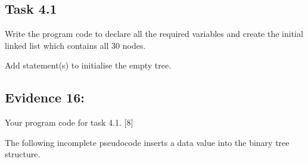 \subsection*{Task 4.1 }

Write the program code to declare all the required variables and create
the initial linked list which contains all 30 nodes. 

Add statement(s) to initialise the empty tree. 

\subsection*{Evidence 16: }

Your program code for task 4.1. \hfill{}{[}8{]}

The following incomplete pseudocode inserts a data value into the
binary tree structure.

